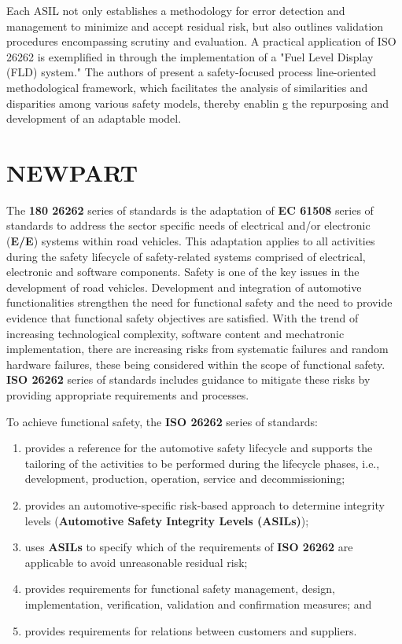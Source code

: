 \documentclass[./dissertation.tex]{subfiles}
\begin{document}
Each ASIL not only establishes a methodology for error detection and management to minimize and accept residual risk, but also outlines validation procedures encompassing scrutiny and evaluation. A practical application of ISO 26262 is exemplified in \cite{westman2013reference} through the implementation of a "Fuel Level Display (FLD) system." The authors of \cite{6903180} present a safety-focused process line-oriented methodological framework, which facilitates the analysis of similarities and disparities among various safety models, thereby enablin  g the repurposing and development of an adaptable model.

\section {NEWPART}
The \textbf{180 26262} series of standards is the adaptation of \textbf{EC 61508} series of standards to address the sector specific needs of electrical and/or electronic (\textbf{E/E}) systems within road vehicles. This adaptation applies to all activities during the safety lifecycle of safety-related systems comprised of electrical, electronic and software components. Safety is one of the key issues in the development of road vehicles. Development and integration of automotive functionalities strengthen the need for functional safety and the need to provide evidence that functional safety objectives are satisfied. With the trend of increasing technological complexity, software content and mechatronic implementation, there are increasing risks from systematic failures and random hardware failures, these being considered within the scope of functional safety. \textbf{ISO 26262} series of standards includes guidance to mitigate these risks by providing appropriate requirements and processes.

To achieve functional safety, the \textbf{ISO 26262} series of standards:

\begin{enumerate}
\item provides a reference for the automotive safety lifecycle and supports the tailoring of the activities to be performed during the lifecycle phases, i.e., development, production, operation, service and decommissioning;
\item provides an automotive-specific risk-based approach to determine integrity levels (\textbf{Automotive Safety Integrity Levels (ASILs)});
\item uses \textbf{ASILs} to specify which of the requirements of \textbf{ISO 26262} are applicable to avoid unreasonable residual risk;
\item provides requirements for functional safety management, design, implementation, verification, validation and confirmation measures; and
\item provides requirements for relations between customers and suppliers.
\end{enumerate}
\end{document}

